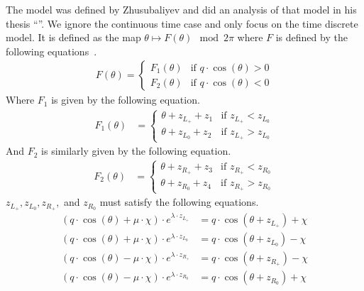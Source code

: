 The model was defined by Zhusubaliyev and  did an analysis of that model in his thesis ``''.
We ignore the continuous time case and only focus on the time discrete model.
It is defined as the map $\theta \mapsto F(\theta) \mod 2 \pi$ where $F$ is defined by the following equations~\cite{akyuz2022}.
\begin{align}
	F(\theta) = \begin{cases}
		            F_1(\theta) & \text{if } q \cdot \cos(\theta) > 0 \\
		            F_2(\theta) & \text{if } q \cdot \cos(\theta) < 0
	            \end{cases}
\end{align}
Where $F_1$ is given by the following equation.
\begin{align}
	F_1(\theta) & = \begin{cases}
		                \theta + z_{L_+} + z_1 & \text{if } z_{L_+} < z_{L_0} \\
		                \theta + z_{L_0} + z_2 & \text{if } z_{L_+} > z_{L_0}
	                \end{cases}
\end{align}
And $F_2$ is similarly given by the following equation.
\begin{align}
	F_2(\theta) & = \begin{cases}
		                \theta + z_{R_+} + z_3 & \text{if } z_{R_+} < z_{R_0} \\
		                \theta + z_{R_0} + z_4 & \text{if } z_{R_+} > z_{R_0}
	                \end{cases}
\end{align}
$z_{L_+}, z_{L_0}, z_{R_+},$ and $z_{R_0}$ must satisfy the following equations.
\begin{subequations}
	\begin{align}
		(q \cdot \cos(\theta) + \mu \cdot \chi) \cdot e^{\lambda \cdot z_{L_+}}
		 & = q \cdot \cos(\theta + z_{L_+}) + \chi \\
		(q \cdot \cos(\theta) + \mu \cdot \chi) \cdot e^{\lambda \cdot z_{L_0}}
		 & = q \cdot \cos(\theta + z_{L_0}) - \chi \\
		(q \cdot \cos(\theta) - \mu \cdot \chi) \cdot e^{\lambda \cdot z_{R_+}}
		 & = q \cdot \cos(\theta + z_{R_+}) - \chi \\
		(q \cdot \cos(\theta) - \mu \cdot \chi) \cdot e^{\lambda \cdot z_{R_0}}
		 & = q \cdot \cos(\theta + z_{R_0}) + \chi
	\end{align}
\end{subequations}
